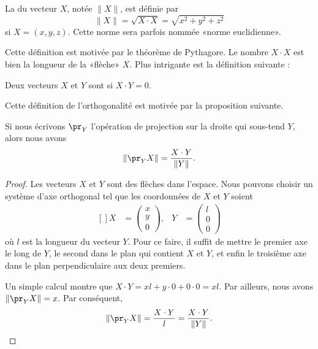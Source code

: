 \begin{definition}
	La  du vecteur $X$, notée $\| X \|$, est définie par
	\begin{equation}
		\| X \|=\sqrt{X\cdot X}=\sqrt{x^2+y^2+z^2}
	\end{equation}
	si $X=(x,y,z)$. Cette norme sera parfois nommée «norme euclidienne».
\end{definition}
Cette définition est motivée par le théorème de Pythagore. Le nombre $X\cdot X$ est bien la longueur de la «flèche» $X$. Plus intrigante est la définition suivante :
\begin{definition}
	Deux vecteurs $X$ et $Y$ sont  si $X\cdot Y=0$.
\end{definition}
Cette définition de l'orthogonalité est motivée par la proposition suivante.

\begin{proposition}		\label{PropProjScal}
	Si nous écrivons $\pr_Y$  l'opération de projection sur la droite qui sous-tend $Y$, alors nous avons
	\begin{equation}
		\| \pr_YX \|=\frac{ X\cdot Y }{ \| Y \| }.
	\end{equation}
\end{proposition}

\begin{proof}
	Les vecteurs $X$ et $Y$ sont des flèches dans l'espace. Nous pouvons choisir un système d'axe orthogonal tel que les coordonnées de $X$ et $Y$ soient
	\begin{equation}
		\begin{aligned}[]
			X&=\begin{pmatrix}
				x	\\
				y	\\
				0
			\end{pmatrix},
			&Y&=\begin{pmatrix}
				l	\\
				0	\\
				0
			\end{pmatrix}
		\end{aligned}
	\end{equation}
	où $l$ est la longueur du vecteur $Y$. Pour ce faire, il suffit de mettre le premier axe le long de $Y$, le second dans le plan qui contient $X$ et $Y$, et enfin le troisième axe dans le plan perpendiculaire aux deux premiers.

	Un simple calcul montre que $X\cdot Y=xl+y\cdot 0+0\cdot 0=xl$. Par ailleurs, nous avons $\| \pr_YX \|=x$. Par conséquent,
	\begin{equation}
		\| \pr_YX \|=\frac{ X\cdot Y }{ l }=\frac{ X\cdot Y }{ \| Y \| }.
	\end{equation}
\end{proof}

